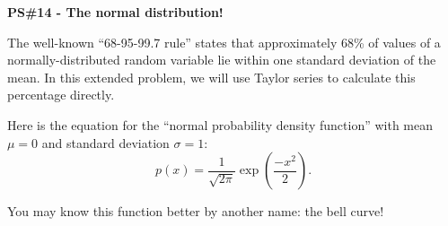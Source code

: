 \documentclass[11pt]{article}
\renewcommand{\section}[1]{\begin{center} \textbf{#1} \\\end{center}}
\begin{document}
%


\allowdisplaybreaks
\section{PS\#14 - The normal distribution! }

\everymath{\displaystyle}

The well-known ``68-95-99.7 rule'' states that approximately 68\% of values of a normally-distributed random variable lie within one standard deviation of the mean. In this extended problem, we will use Taylor series to calculate this percentage directly.

Here is the equation for the ``normal probability density function'' with mean $\mu=0$ and standard deviation $\sigma=1$: \[p(x) = \frac{1}{\sqrt{2\pi}} \exp\left(\frac{-x^2}{2}\right).\]

You may know this function better by another name: the bell curve!
\end{document}
